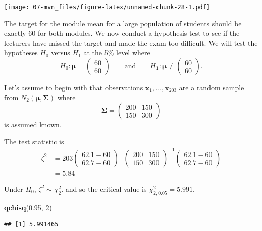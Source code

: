 \documentclass[]{book}
\newenvironment{Shaded}{\begin{snugshade}}{\end{snugshade}}
\newcommand{\DecValTok}[1]{\textcolor[rgb]{0.00,0.00,0.81}{#1}}
\newcommand{\FloatTok}[1]{\textcolor[rgb]{0.00,0.00,0.81}{#1}}
\newcommand{\KeywordTok}[1]{\textcolor[rgb]{0.13,0.29,0.53}{\textbf{#1}}}
\newcommand{\NormalTok}[1]{#1}
\theoremstyle{definition}
\theoremstyle{definition}
\theoremstyle{definition}
\theoremstyle{remark}
\begin{document}
\texttt{[image: 07-mvn\_files/figure-latex/unnamed-chunk-28-1.pdf]}

The target for the module mean for a large population of students should be exactly 60 for both modules. We now conduct a hypothesis test to see if the lecturers have missed the target and made the exam too difficult. We will test the hypotheses \(H_0\) versus \(H_1\) at the 5\% level where
\[
H_0: \boldsymbol \mu= \begin{pmatrix} 60 \\ 60 \end{pmatrix} \qquad \text{and} \qquad H_1: \boldsymbol \mu\neq \begin{pmatrix} 60 \\ 60 \end{pmatrix}.
\]

Let's assume to begin with that observations \(\boldsymbol x_1,\ldots,\boldsymbol x_{203}\) are a random sample from \(N_2(\boldsymbol \mu,\boldsymbol \Sigma)\) where
\[
\boldsymbol \Sigma= \begin{pmatrix} 200 & 150 \\ 150 & 300 \end{pmatrix}
\]
is assumed known.

The test statistic is
\begin{align*}
\zeta^2 &= 203 \begin{pmatrix} 62.1 - 60 \\ 62.7 - 60 \end{pmatrix}^\top \begin{pmatrix} 200 & 150 \\ 150 & 300 \end{pmatrix}^{-1} \begin{pmatrix} 62.1 - 60 \\ 62.7 - 60 \end{pmatrix}\\
&=5.84
\end{align*}

Under \(H_0\), \(\zeta^2\sim \chi^2_2\). and so the critical value is \(\chi^2_{2,0.05} = 5.991\).

\begin{Shaded}
\begin{Highlighting}[]
\KeywordTok{qchisq}\NormalTok{(}\FloatTok{0.95}\NormalTok{, }\DecValTok{2}\NormalTok{)}
\end{Highlighting}
\end{Shaded}

\begin{verbatim}
## [1] 5.991465
\end{verbatim}
\end{document}
